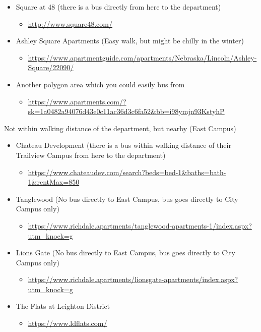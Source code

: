 \documentclass[
  12pt,
]{book}
\providecommand{\tightlist}{%
  \setlength{\itemsep}{0pt}\setlength{\parskip}{0pt}}
\begin{document}
\begin{itemize}
\tightlist
\item
  Square at 48 (there is a bus directly from here to the department)

  \begin{itemize}
  \tightlist
  \item
    \url{http://www.square48.com/}
  \end{itemize}
\item
  Ashley Square Apartments (Easy walk, but might be chilly in the winter)

  \begin{itemize}
  \tightlist
  \item
    \url{https://www.apartmentguide.com/apartments/Nebraska/Lincoln/Ashley-Square/22090/}
  \end{itemize}
\item
  Another polygon area which you could easily bus from

  \begin{itemize}
  \tightlist
  \item
    \url{https://www.apartments.com/?sk=1a0482a94076d43e0c11ac36d3c6fa52\&bb=i98ymjn93KstyhP}
  \end{itemize}
\end{itemize}

Not within walking distance of the department, but nearby (East Campus)

\begin{itemize}
\tightlist
\item
  Chateau Development (there is a bus within walking distance of their Trailview Campus from here to the department)

  \begin{itemize}
  \tightlist
  \item
    \url{https://www.chateaudev.com/search?beds=bed-1\&baths=bath-1\&rentMax=850}
  \end{itemize}
\item
  Tanglewood (No bus directly to East Campus, bus goes directly to City Campus only)

  \begin{itemize}
  \tightlist
  \item
    \url{https://www.richdale.apartments/tanglewood-apartments-1/index.aspx?utm_knock=g}
  \end{itemize}
\item
  Lions Gate (No bus directly to East Campus, bus goes directly to City Campus only)

  \begin{itemize}
  \tightlist
  \item
    \url{https://www.richdale.apartments/lionsgate-apartments/index.aspx?utm_knock=g}
  \end{itemize}
\item
  The Flats at Leighton District

  \begin{itemize}
  \tightlist
  \item
    \url{https://www.ldflats.com/}
  \end{itemize}
\end{itemize}
\end{document}
